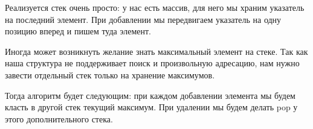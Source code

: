 \documentclass[../main.tex]{subfiles}
\begin{document}
	Реализуется стек очень просто: у нас есть массив, для него мы храним указатель на последний элемент. При добавлении мы передвигаем указатель на одну позицию вперед и пишем туда элемент.
	
	Иногда может возникнуть желание знать максимальный элемент на стеке. Так как наша структура не поддерживает поиск и произвольную адресацию, нам нужно завести отдельный стек только на хранение максимумов. 
	
	Тогда алгоритм будет следующим: при каждом добавлении элемента мы будем класть в другой стек текущий максимум. При удалении мы будем делать pop у этого дополнительного стека.
	
	\pagebreak
\end{document}
